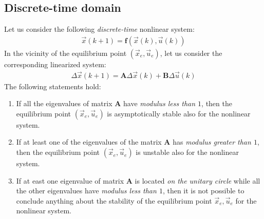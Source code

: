 \documentclass[11pt,a4paper,oneside]{book}
\numberwithin{equation}{section}
\theoremstyle{it}
\theoremstyle{definition}
\begin{document}
\subsection{Discrete-time domain}
Let us consider the following \textit{discrete-time} nonlinear system:
\begin{equation}\label{eqlyap3}
	\begin{aligned}
		\vec{x}(k+1)=\mathbf{f}\left(\vec{x}(k),\vec{u}(k)\right) 
	\end{aligned}
\end{equation}
In the vicinity of the equilibrium point $(\vec{x}_e,\vec{u}_e)$, let us 
consider the corresponding linearized system:
\begin{equation}\label{eqlyap4}
	\begin{aligned}
		\Delta{\vec{x}}(k+1)={\mathbf{A}}\Delta\vec{x}(k)+{\mathbf{B}}\Delta\vec{u}(k)
	\end{aligned}
\end{equation}
The following statements hold:
\begin{enumerate}
	\item If all the eigenvalues of matrix ${\mathbf{A}}$ have 
	\textit{modulus less than $1$}, then the equilibrium point $\left( 
	\vec{x}_e, \vec{u}_e\right)$ is asymptotically stable also for the 
	nonlinear system.
	\item If at least one of the eigenvalues of the matrix ${\mathbf{A}}$ 
	has \textit{modulus greater than $1$}, then the equilibrium point $\left( 
	\vec{x}_e, \vec{u}_e\right)$ is unstable also for the nonlinear system.
	\item If at east one eigenvalue of matrix ${\mathbf{A}}$ is located 
	\textit{on the unitary circle} while all the other eigenvalues have 
	\textit{modulus less than $1$}, then it is not possible to conclude 
	anything about the stability of the equilibrium point $\vec{x}_e,\vec{u}_e$ 
	for the nonlinear system.
\end{enumerate}
\end{document}
